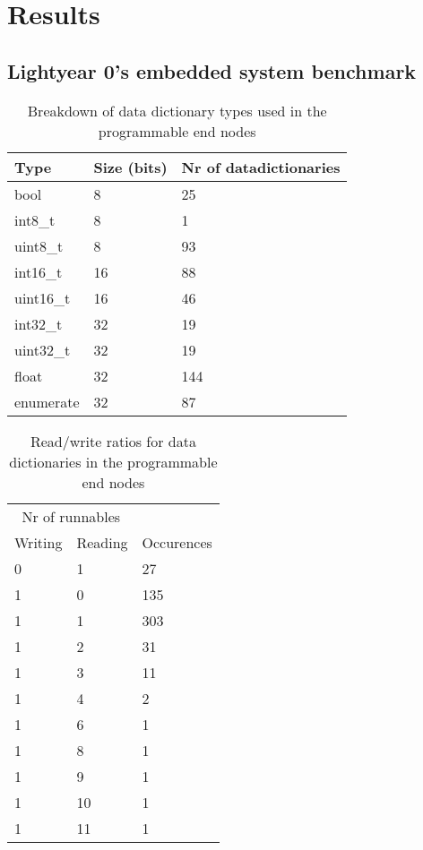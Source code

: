 \section{Results}
\label{sec:results}
\subsection{Lightyear 0's embedded system benchmark}

\begin{table}[htb]
    \centering
    \begin{tabular}{@{}lll@{}}
    \toprule
    Type      & Size (bits) & Nr of datadictionaries \\ \midrule
    bool      & 8           & 25                     \\
    int8\_t   & 8           & 1                      \\
    uint8\_t  & 8           & 93                     \\
    int16\_t  & 16          & 88                     \\
    uint16\_t & 16          & 46                     \\
    int32\_t  & 32          & 19                     \\
    uint32\_t & 32          & 19                     \\
    float     & 32          & 144                    \\
    enumerate & 32          & 87                     \\ \bottomrule
    \end{tabular}
    \caption{Breakdown of data dictionary types used in the programmable end nodes}
    \label{tab:prog_nodes_types}
\end{table}

\begin{table}[htb]
    \centering
    \begin{tabular}{@{}lll@{}}
    \toprule
    \multicolumn{2}{c}{Nr of runnables} & \\
    Writing & Reading & Occurences \\ \midrule
    0       & 1      & 27         \\
    1       & 0      & 135        \\
    1       & 1      & 303        \\
    1       & 2      & 31         \\
    1       & 3      & 11         \\
    1       & 4      & 2          \\
    1       & 6      & 1          \\
    1       & 8      & 1          \\
    1       & 9      & 1          \\
    1       & 10     & 1          \\
    1       & 11     & 1          \\ \bottomrule
    \end{tabular}
    \caption{Read/write ratios for data dictionaries in the programmable end nodes}
    \label{tab:prog_nodes_read_write}
\end{table}

